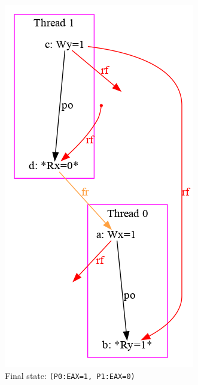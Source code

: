 \begin{figure}[!htb]
\begin{subfigure}[t]{.23\textwidth}
  \includegraphics[width=.9\linewidth]{img/my/sb-example/SB-dot-2.png}
  \caption{Final state: \texttt{(P0:EAX=1,~P1:EAX=0)}}
  \label{simple_wmm_x86_pic:sub2}
\end{subfigure}
\hfill
\begin{subfigure}[t]{.23\textwidth}
  \centering

\end{subfigure}
\end{figure}
